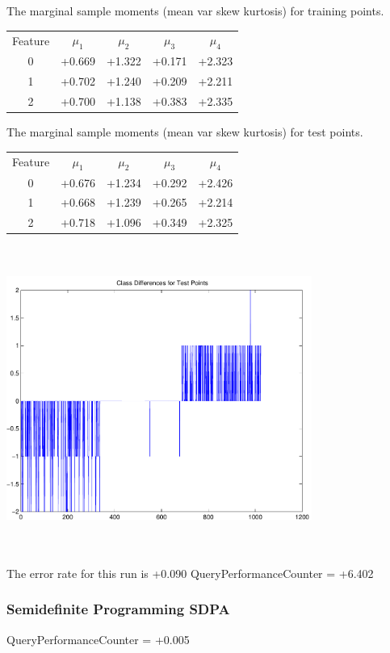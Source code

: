 \documentclass[9pt]{article}
\theoremstyle{plain}
\theoremstyle{definition}
\theoremstyle{remark}
\numberwithin{equation}{section}
\begin{document}
The marginal sample moments (mean var skew kurtosis) for training points.\newline
\begin{tabular}{ c |  c  c  c  c}
Feature & $\mu_1$ & $\mu_2$ & $\mu_3$ & $\mu_4$ \\
0 & +0.669 & +1.322 & +0.171& +2.323 \\
\hline
1 & +0.702 & +1.240 & +0.209& +2.211 \\
\hline
2 & +0.700 & +1.138 & +0.383& +2.335 \\
\hline
\end{tabular}
\newline
The marginal sample moments (mean var skew kurtosis) for test points.\newline
\begin{tabular}{ c | c  c  c  c}
Feature & $\mu_1$ & $\mu_2$ & $\mu_3$ & $\mu_4$ \\
0 & +0.676 & +1.234 & +0.292& +2.426\\
\hline
1 & +0.668 & +1.239 & +0.265& +2.214\\
\hline
2 & +0.718 & +1.096 & +0.349& +2.325\\
\hline
\end{tabular}\newline
\includegraphics[width=10.0cm,height=10.0cm]{classDiffs.pdf}

The error rate for this run is +0.090\newline
QueryPerformanceCounter  =  +6.402
\subsubsection{Semidefinite Programming SDPA}
QueryPerformanceCounter  =  +0.005
\end{document}
